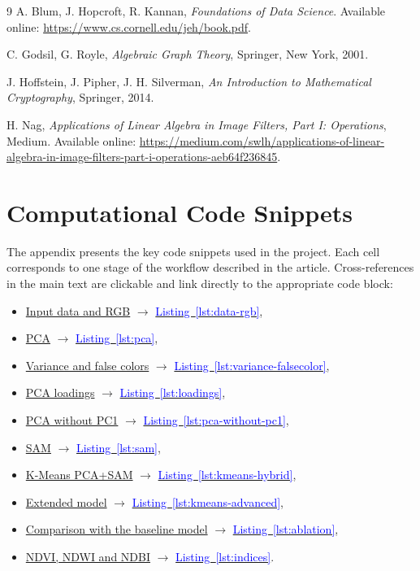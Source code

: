 \documentclass[12pt,a4paper]{article}
\newcommand{\kodref}[2]{\hyperref[#1]{\textcolor{blue}{#2}}}
\begin{document}
\begin{thebibliography}{9}
A. Blum, J. Hopcroft, R. Kannan, \textit{Foundations of Data Science}. Available online: \url{https://www.cs.cornell.edu/jeh/book.pdf}.

C. Godsil, G. Royle, \textit{Algebraic Graph Theory}, Springer, New York, 2001.

J. Hoffstein, J. Pipher, J. H. Silverman, \textit{An Introduction to Mathematical Cryptography}, Springer, 2014.

H. Nag, \textit{Applications of Linear Algebra in Image Filters, Part I: Operations}, Medium. Available online: \url{https://medium.com/swlh/applications-of-linear-algebra-in-image-filters-part-i-operations-aeb64f236845}.

\end{thebibliography}

\appendix
\section{Computational Code Snippets}
\label{app:kod}

The appendix presents the key code snippets used in the project. Each cell corresponds to one stage of the workflow described in the article. Cross-references in the main text are clickable and link directly to the appropriate code block:

\begin{itemize}
    \item \hyperref[sec:dane]{Input data and RGB} $\rightarrow$ \kodref{lst:data-rgb}{Listing~\ref*{lst:data-rgb}},
    \item \hyperref[sec:pca]{PCA} $\rightarrow$ \kodref{lst:pca}{Listing~\ref*{lst:pca}},
    \item \hyperref[sec:wariancja]{Variance and false colors} $\rightarrow$ \kodref{lst:variance-falsecolor}{Listing~\ref*{lst:variance-falsecolor}},
    \item \hyperref[sec:ladunki]{PCA loadings} $\rightarrow$ \kodref{lst:loadings}{Listing~\ref*{lst:loadings}},
    \item \hyperref[sec:bezpc1]{PCA without PC1} $\rightarrow$ \kodref{lst:pca-without-pc1}{Listing~\ref*{lst:pca-without-pc1}},
    \item \hyperref[sec:sam]{SAM} $\rightarrow$ \kodref{lst:sam}{Listing~\ref*{lst:sam}},
    \item \hyperref[sec:kmeans]{K-Means PCA+SAM} $\rightarrow$ \kodref{lst:kmeans-hybrid}{Listing~\ref*{lst:kmeans-hybrid}},
    \item \hyperref[sec:model-rozszerzony]{Extended model} $\rightarrow$ \kodref{lst:kmeans-advanced}{Listing~\ref*{lst:kmeans-advanced}},
    \item \hyperref[sec:porownanie-baza]{Comparison with the baseline model} $\rightarrow$ \kodref{lst:ablation}{Listing~\ref*{lst:ablation}},
    \item \hyperref[sec:indeksy]{NDVI, NDWI and NDBI} $\rightarrow$ \kodref{lst:indices}{Listing~\ref*{lst:indices}}.
\end{itemize}
\end{document}
